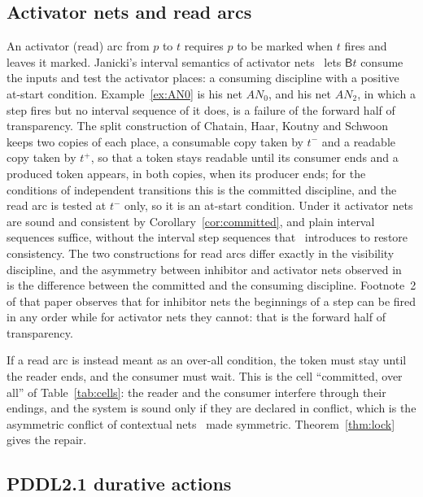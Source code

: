 \documentclass[preprint,12pt]{elsarticle}
\theoremstyle{plain}
\theoremstyle{definition}
\newcommand{\B}[1]{\mathsf{B}#1}
\begin{document}
\subsection{Activator nets and read arcs}

An activator (read) arc from $p$ to $t$ requires $p$ to be marked when $t$ fires and leaves it marked. Janicki's interval semantics of activator nets~\cite{Janicki2019} lets $\B{t}$ consume the inputs and test the activator places: a consuming discipline with a positive at-start condition. Example~\ref{ex:AN0} is his net $\mathit{AN}_0$, and his net $\mathit{AN}_2$, in which a step fires but no interval sequence of it does, is a failure of the forward half of transparency. The split construction of Chatain, Haar, Koutny and Schwoon~\cite{ChatainHaarKoutnySchwoon2015} keeps two copies of each place, a consumable copy taken by $t^-$ and a readable copy taken by $t^+$, so that a token stays readable until its consumer ends and a produced token appears, in both copies, when its producer ends; for the conditions of independent transitions this is the committed discipline, and the read arc is tested at $t^-$ only, so it is an at-start condition. Under it activator nets are sound and consistent by Corollary~\ref{cor:committed}, and plain interval sequences suffice, without the interval step sequences that~\cite{Janicki2019} introduces to restore consistency. The two constructions for read arcs differ exactly in the visibility discipline, and the asymmetry between inhibitor and activator nets observed in~\cite{Janicki2019} is the difference between the committed and the consuming discipline. Footnote~2 of that paper observes that for inhibitor nets the beginnings of a step can be fired in any order while for activator nets they cannot: that is the forward half of transparency.

If a read arc is instead meant as an over-all condition, the token must stay until the reader ends, and the consumer must wait. This is the cell ``committed, over all'' of Table~\ref{tab:cells}: the reader and the consumer interfere through their endings, and the system is sound only if they are declared in conflict, which is the asymmetric conflict of contextual nets~\cite{MontanariRossi1995,BaldanCorradiniMontanari2001} made symmetric. Theorem~\ref{thm:lock} gives the repair.

\subsection{PDDL2.1 durative actions}
\end{document}
